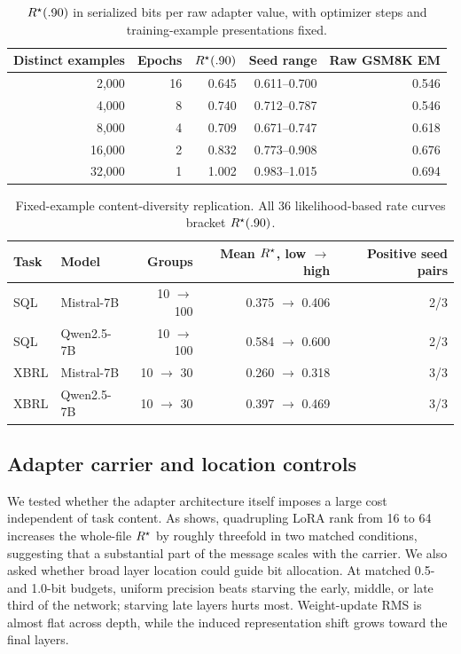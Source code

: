 \begin{table}[htb]
\centering\small
\begin{tabular}{rrrrr}
\toprule
Distinct examples & Epochs & $R^{\star}(.90)$ & Seed range & Raw GSM8K EM \\
\midrule
2,000 & 16 & 0.645 & 0.611--0.700 & 0.546 \\
4,000 & 8 & 0.740 & 0.712--0.787 & 0.546 \\
8,000 & 4 & 0.709 & 0.671--0.747 & 0.618 \\
16,000 & 2 & 0.832 & 0.773--0.908 & 0.676 \\
32,000 & 1 & 1.002 & 0.983--1.015 & 0.694 \\
\bottomrule
\end{tabular}
\caption{$R^{\star}(.90)$ in serialized bits per raw adapter value, with optimizer steps and training-example presentations fixed.}
\label{tab:distinct-rate}
\end{table}

\begin{table}[htb]
\centering\small
\begin{tabular}{llrrr}
\toprule
Task & Model & Groups & Mean $R^{\star}$, low $\rightarrow$ high & Positive seed pairs \\
\midrule
SQL & Mistral-7B & 10 $\rightarrow$ 100 & 0.375 $\rightarrow$ 0.406 & 2/3 \\
SQL & Qwen2.5-7B & 10 $\rightarrow$ 100 & 0.584 $\rightarrow$ 0.600 & 2/3 \\
XBRL & Mistral-7B & 10 $\rightarrow$ 30 & 0.260 $\rightarrow$ 0.318 & 3/3 \\
XBRL & Qwen2.5-7B & 10 $\rightarrow$ 30 & 0.397 $\rightarrow$ 0.469 & 3/3 \\
\bottomrule
\end{tabular}
\caption{Fixed-example content-diversity replication. All 36 likelihood-based rate curves bracket $R^{\star}(.90)$.}
\label{tab:diversity-replication}
\end{table}

\subsection{Adapter carrier and location controls}
\label{app:carrier-location}

We tested whether the adapter architecture itself imposes a large cost independent of task content. As  shows, quadrupling LoRA rank from 16 to 64 increases the whole-file $R^{\star}$ by roughly threefold in two matched conditions, suggesting that a substantial part of the message scales with the carrier. We also asked whether broad layer location could guide bit allocation. At matched 0.5- and 1.0-bit budgets, uniform precision beats starving the early, middle, or late third of the network; starving late layers hurts most. Weight-update RMS is almost flat across depth, while the induced representation shift grows toward the final layers.


